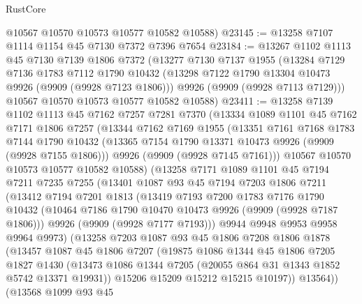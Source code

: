 \begin{lexlean}{RustCore}
\begin{coremodule}
      @10567
      @10570
      @10573
      @10577
      @10582
      @10588)
@23145 := @13258 @7107 @1114 @1154 @45 @7130 @7372 @7396 @7654
@23184 := @13267
    @1102
    @1113
    @45
    @7130
    @7139
    @1806
    @7372
    (@13277
      @7130
      @7137
      @1955
      (@13284
        @7129
        @7136
        @1783
        @7112
        @1790
        @10432
        (@13298 @7122 @1790 @13304 @10473 @9926 (@9909 (@9928 @7123 @1806)))
        @9926
        (@9909 (@9928 @7113 @7129)))
      @10567
      @10570
      @10573
      @10577
      @10582
      @10588)
@23411 := @13258
    @7139
    @1102
    @1113
    @45
    @7162
    @7257
    @7281
    @7370
    (@13334
      @1089
      @1101
      @45
      @7162
      @7171
      @1806
      @7257
      (@13344
        @7162
        @7169
        @1955
        (@13351
          @7161
          @7168
          @1783
          @7144
          @1790
          @10432
          (@13365 @7154 @1790 @13371 @10473 @9926 (@9909 (@9928 @7155 @1806)))
          @9926
          (@9909 (@9928 @7145 @7161)))
        @10567
        @10570
        @10573
        @10577
        @10582
        @10588)
      (@13258
        @7171
        @1089
        @1101
        @45
        @7194
        @7211
        @7235
        @7255
        (@13401
          @1087
          @93
          @45
          @7194
          @7203
          @1806
          @7211
          (@13412
            @7194
            @7201
            @1813
            (@13419
              @7193
              @7200
              @1783
              @7176
              @1790
              @10432
              (@10464 @7186 @1790 @10470 @10473 @9926 (@9909 (@9928 @7187 @1806)))
              @9926
              (@9909 (@9928 @7177 @7193)))
            @9944
            @9948
            @9953
            @9958
            @9964
            @9973)
          (@13258
            @7203
            @1087
            @93
            @45
            @1806
            @7208
            @1806
            @1878
            (@13457
              @1087
              @45
              @1806
              @7207
              (@19875
                @1086
                @1344
                @45
                @1806
                @7205
                @1827
                @1430
                (@13473 @1086 @1344 @7205 (@20055 @864 @31 @1343 @1852 @5742 @13371 @19931))
                @15206
                @15209
                @15212
                @15215
                @10197))
            @13564))
        (@13568
          @1099
          @93
          @45

\end{coremodule}
\end{lexlean}
